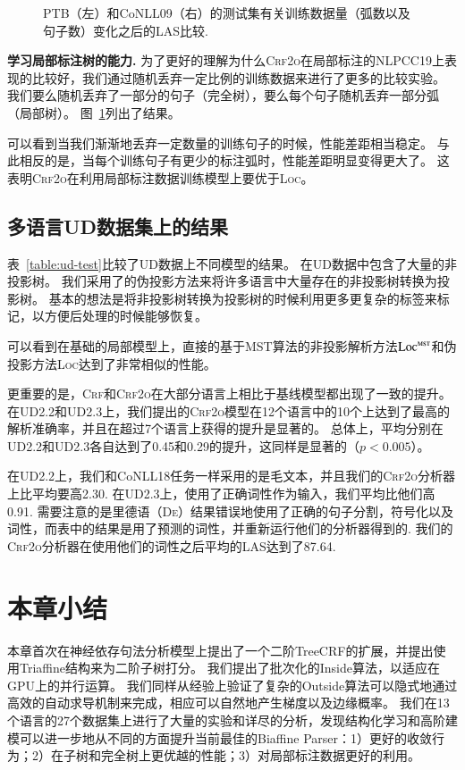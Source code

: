 \begin{figure}[tb!]
\begin{subfigure}[b]{0.4\textwidth}
	\end{subfigure}
	\caption{
		PTB（左）和CoNLL09（右）的测试集有关训练数据量（弧数以及句子数）变化之后的LAS比较.
	}
	\label{fig:part-gap}
\end{figure}

\noindent\textbf{学习局部标注树的能力.}
为了更好的理解为什么\textsc{Crf2o}在局部标注的NLPCC19上表现的比较好，我们通过随机丢弃一定比例的训练数据来进行了更多的比较实验。
我们要么随机丢弃了一部分的句子（完全树），要么每个句子随机丢弃一部分弧（局部树）。
图~\ref{fig:part-gap}列出了结果。

可以看到当我们渐渐地丢弃一定数量的训练句子的时候，性能差距相当稳定。
与此相反的是，当每个训练句子有更少的标注弧时，性能差距明显变得更大了。
这表明\textsc{Crf2o}在利用局部标注数据训练模型上要优于\textsc{Loc}。



\subsection{多语言UD数据集上的结果}

表~\ref{table:ud-test}比较了UD数据上不同模型的结果。
在UD数据中包含了大量的非投影树。
我们采用了\citet{nivre-nilsson-2005-pseudo}的伪投影方法来将许多语言中大量存在的非投影树转换为投影树。
基本的想法是将非投影树转换为投影树的时候利用更多更复杂的标签来标记，以方便后处理的时候能够恢复。

可以看到在基础的局部模型上，直接的基于MST算法的非投影解析方法$\textsc{Loc}^{\textsc{mst}}$和伪投影方法\textsc{Loc}达到了非常相似的性能。

更重要的是，\textsc{Crf}和\textsc{Crf2o}在大部分语言上相比于基线模型都出现了一致的提升。
在UD2.2和UD2.3上，我们提出的\textsc{Crf2o}模型在12个语言中的10个上达到了最高的解析准确率，并且在超过7个语言上获得的提升是显著的。
总体上，平均分别在UD2.2和UD2.3各自达到了0.45和0.29的提升，这同样是显著的（$p<0.005$）。

在UD2.2上，我们和CoNLL18任务一样采用的是毛文本，并且我们的\textsc{Crf2o}分析器上比\citet{ji-etal-2019-graph}平均要高2.30.
在UD2.3上，\citet{zhang-etal-2019-empirical}使用了正确词性作为输入，我们平均比他们高0.91.
需要注意的是\citet{ji-etal-2019-graph}里德语（\textsc{De}）结果错误地使用了正确的句子分割，符号化以及词性，而表中的结果是用了预测的词性，并重新运行他们的分析器得到的.
我们的\textsc{Crf2o}分析器在使用他们的词性之后平均的LAS达到了87.64.

\section{本章小结}
\label{sec:dep-conclusions}

本章首次在神经依存句法分析模型上提出了一个二阶TreeCRF的扩展，并提出使用Triaffine结构来为二阶子树打分。
我们提出了批次化的Inside算法，以适应在GPU上的并行运算。
我们同样从经验上验证了复杂的Outside算法可以隐式地通过高效的自动求导机制来完成，相应可以自然地产生梯度以及边缘概率。
我们在13个语言的27个数据集上进行了大量的实验和详尽的分析，发现结构化学习和高阶建模可以进一步地从不同的方面提升当前最佳的Biaffine Parser：1）更好的收敛行为；2）在子树和完全树上更优越的性能；3）对局部标注数据更好的利用。
